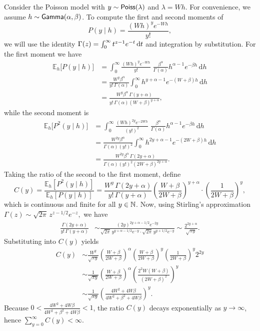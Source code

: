 Consider the Poisson model with  $y \sim {\sf{Poiss}}(\lambda)$ and $\lambda = W h$.
For convenience, we assume $h \sim {\sf{Gamma}}(\alpha, \beta)$.
To compute the first and second moments of 
\[
  P(y\mid h) = \frac{(W h)^{y} e^{-W h}}{y!},
\]
we will use the identity
$\Gamma(z) = \int_0^\infty t^{z-1} e^{-t} \, \d t$ and integration by substitution.
For the first moment we have 
\begin{align}
\mathbb{E}_{h}\bigl[P(y\mid h)\bigr]
  &= \int_{0}^{\infty} \frac{(W h)^{y} e^{-W h}}{y!}
     \;\frac{\beta^{\alpha}}{\Gamma(\alpha)} h^{\alpha-1} e^{-\beta h} \, \mathrm{d}h\\[6pt]
  &= \frac{W^{y} \beta^{\alpha}}{y!\,\Gamma(\alpha)}
     \int_{0}^{\infty} h^{y+\alpha-1} e^{-(W+\beta)h} \, \mathrm{d}h\\[6pt]
  &= \frac{W^{y} \beta^{\alpha}\,\Gamma(y+\alpha)}{y!\,\Gamma(\alpha)(W+\beta)^{y+\alpha}},
\end{align}
while the second moment is 
\begin{align}
\mathbb{E}_{h}\bigl[P^{2}(y\mid h)\bigr]
  &= \int_{0}^{\infty} \frac{(W h)^{2y} e^{-2 W h}}{(y!)^{2}}
     \;\frac{\beta^{\alpha}}{\Gamma(\alpha)} h^{\alpha-1} e^{-\beta h} \, \mathrm{d}h\\[6pt]
  &= \frac{W^{2y} \beta^{\alpha}}{\Gamma(\alpha)(y!)^{2}}
     \int_{0}^{\infty} h^{2y+\alpha-1} e^{-(2W+\beta)h} \, \mathrm{d}h\\[6pt]
  &= \frac{W^{2y} \beta^{\alpha}\, \Gamma(2y+\alpha)}{\Gamma(\alpha)(y!)^{2}(2W+\beta)^{2y+\alpha}}.
\end{align}
% 
Taking the ratio of the second to the first moment, define 
\[
  C(y) = \frac{\mathbb{E}_{h}[P^{2}(y\mid h)]}{\mathbb{E}_{h}[P(y\mid h)]}
         = \frac{W^{y} \, \Gamma(2y+\alpha)}{y!\,\Gamma(y+\alpha)}
           \left(\frac{W+\beta}{2W+\beta}\right)^{y+\alpha}
           \cdot\left(\frac{1}{2W+\beta}\right)^{y},
\]
which is continuous and finite for all $y \in \mathbb{N}$. 
Now, using Stirling's approximation
$ \Gamma(z) \sim \sqrt{2\pi}\, z^{z-1/2} e^{-z},$ we have
\begin{align}
    \frac{\Gamma(2y+\alpha)}{y!\,\Gamma(y+\alpha)} &\sim
    \frac{(2y)^{2y+\alpha-1/2} e^{-2y}}{\sqrt{2\pi}\,y^{y+\alpha-1/2} e^{-y}\cdot \sqrt{2\pi}\,y^{y+1/2} e^{-y}}
    \sim \frac{2^{2y+\alpha}}{\sqrt{\pi y}}.
\end{align}
Substituting into $C(y)$ yields
\begin{align}
C(y)
 &\sim \frac{W^{y}}{\sqrt{\pi y}}
        \left(\frac{W+\beta}{2W+\beta}\right)^{\alpha}
        \left(\frac{W+\beta}{2W+\beta}\right)^{y}
        \left(\frac{1}{2W+\beta}\right)^{y}
        2^{2y}\\
 &\sim \frac{1}{\sqrt{\pi y}}
        \left(\frac{W+\beta}{2W+\beta}\right)^{\alpha}
        \left(\frac{2^2W(W+\beta)}{(2W+\beta)^2}\right)^{y}\\
 &\sim \frac{1}{\sqrt{\pi y}}
        \left(\frac{4W^2+4W\beta}{4W^2+\beta^2+4W\beta}\right)^{y}.      
\end{align}
Because $0<\frac{4W^2+4W\beta}{4W^2+\beta^2+4W\beta} < 1$, the ratio $C(y)$ decays exponentially as $y \to \infty$, 
hence $\sum_{y=0}^{\infty} C(y)  <\infty$.

